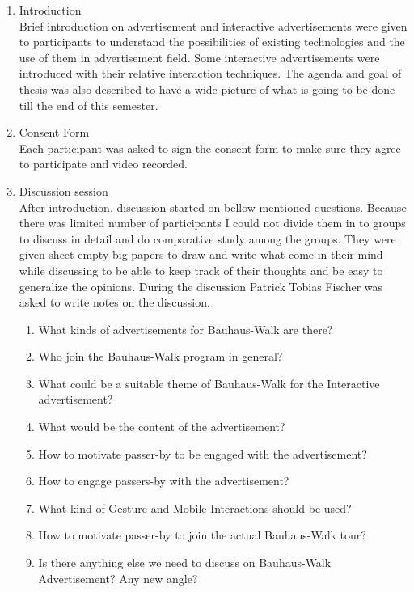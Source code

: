 \begin{enumerate}
\item Introduction \\
Brief introduction on advertisement and interactive advertisements were given to participants to understand the possibilities of existing technologies and the use of them in advertisement field. Some interactive advertisements were introduced with their relative interaction techniques. The agenda and goal of thesis was also described to have a wide picture of what is going to be done till the end of this semester.

\item Consent Form \\
Each participant was asked to sign the consent form to make sure they agree to participate and video recorded.

\item Discussion session \\
After introduction, discussion started on bellow mentioned questions. Because there was limited number of participants I could not divide them in to groups to discuss in detail and do comparative study among the groups. They were given sheet empty big papers to draw and write what come in their mind while discussing to be able to keep track of their thoughts and be easy to generalize the opinions. During the discussion Patrick Tobias Fischer was asked to write notes on the discussion.

\begin{enumerate}
\item   What kinds of advertisements for Bauhaus-Walk are there?
\item   Who join the Bauhaus-Walk program in general?
\item   What could be a suitable theme of Bauhaus-Walk for the Interactive advertisement?
\item   What would be the content of the advertisement?
\item   How to motivate passer-by to be engaged with the advertisement?
\item   How to engage passers-by with the advertisement?
\item   What kind of Gesture and Mobile Interactions should be used?
\item   How to motivate passer-by to join the actual Bauhaus-Walk tour?
\item   Is there anything else we need to discuss on Bauhaus-Walk Advertisement? Any new angle?

\end{enumerate}


\end{enumerate}


